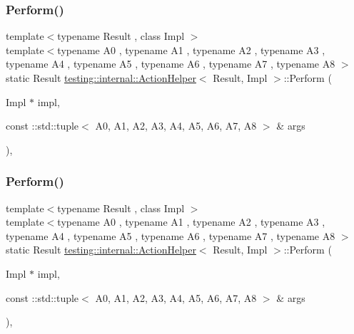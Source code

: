 \mbox{\label{classtesting_1_1internal_1_1_action_helper_a4ef8d66e853868f2b29ce6cd7ed84ee1}} 
\subsubsection{\texorpdfstring{Perform()}{Perform()}\hspace{0.1cm}{\footnotesize\ttfamily [19/33]}}
{\footnotesize\ttfamily template$<$typename Result , class Impl $>$ \\
template$<$typename A0 , typename A1 , typename A2 , typename A3 , typename A4 , typename A5 , typename A6 , typename A7 , typename A8 $>$ \\
static Result \mbox{\hyperlink{classtesting_1_1internal_1_1_action_helper}{testing\+::internal\+::\+Action\+Helper}}$<$ Result, Impl $>$\+::Perform (\begin{DoxyParamCaption}\item[{Impl $\ast$}]{impl,  }\item[{const \+::std\+::tuple$<$ A0, A1, A2, A3, A4, A5, A6, A7, A8 $>$ \&}]{args }\end{DoxyParamCaption})\hspace{0.3cm}{\ttfamily [inline]}, {\ttfamily [static]}}

\mbox{\label{classtesting_1_1internal_1_1_action_helper_a4ef8d66e853868f2b29ce6cd7ed84ee1}} 
\subsubsection{\texorpdfstring{Perform()}{Perform()}\hspace{0.1cm}{\footnotesize\ttfamily [20/33]}}
{\footnotesize\ttfamily template$<$typename Result , class Impl $>$ \\
template$<$typename A0 , typename A1 , typename A2 , typename A3 , typename A4 , typename A5 , typename A6 , typename A7 , typename A8 $>$ \\
static Result \mbox{\hyperlink{classtesting_1_1internal_1_1_action_helper}{testing\+::internal\+::\+Action\+Helper}}$<$ Result, Impl $>$\+::Perform (\begin{DoxyParamCaption}\item[{Impl $\ast$}]{impl,  }\item[{const \+::std\+::tuple$<$ A0, A1, A2, A3, A4, A5, A6, A7, A8 $>$ \&}]{args }\end{DoxyParamCaption})\hspace{0.3cm}{\ttfamily [inline]}, {\ttfamily [static]}}

